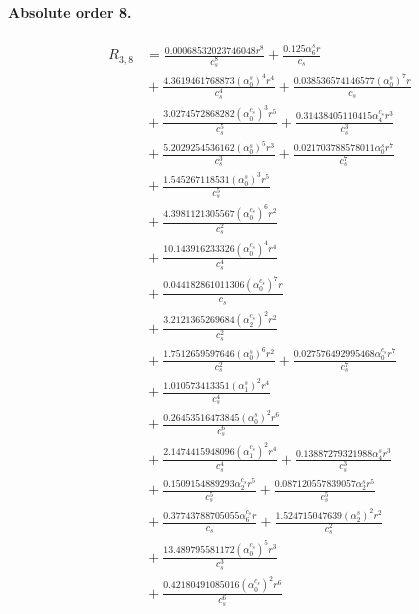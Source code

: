 \documentclass[10pt]{article}
\begin{document}
\paragraph{Absolute order 8.}
\begin{align*}
R_{3,8} &= \frac{0.00068532023746048 r^{8}}{c_{s}^{8}} + \frac{0.125 \alpha_{6}^s r}{c_{s}} \\
&{}  + \frac{4.3619461768873 \left(\alpha_{0}^s\right)^{4} r^{4}}{c_{s}^{4}} + \frac{0.038536574146577 \left(\alpha_{0}^s\right)^{7} r}{c_{s}} \\
&{}  + \frac{3.0274572868282 \left(\alpha_{0}^{c_s}\right)^{3} r^{5}}{c_{s}^{5}} + \frac{0.31438405110415 \alpha_{4}^{c_s} r^{3}}{c_{s}^{3}} \\
&{}  + \frac{5.2029254536162 \left(\alpha_{0}^s\right)^{5} r^{3}}{c_{s}^{3}} + \frac{0.021703788578011 \alpha_{0}^s r^{7}}{c_{s}^{7}} \\
&{}  + \frac{1.545267118531 \left(\alpha_{0}^s\right)^{3} r^{5}}{c_{s}^{5}} \\
&{}  + \frac{4.3981121305567 \left(\alpha_{0}^{c_s}\right)^{6} r^{2}}{c_{s}^{2}} \\
&{}  + \frac{10.143916233326 \left(\alpha_{0}^{c_s}\right)^{4} r^{4}}{c_{s}^{4}} \\
&{}  + \frac{0.044182861011306 \left(\alpha_{0}^{c_s}\right)^{7} r}{c_{s}} \\
&{}  + \frac{3.2121365269684 \left(\alpha_{2}^{c_s}\right)^{2} r^{2}}{c_{s}^{2}} \\
&{}  + \frac{1.7512659597646 \left(\alpha_{0}^s\right)^{6} r^{2}}{c_{s}^{2}} + \frac{0.027576492995468 \alpha_{0}^{c_s} r^{7}}{c_{s}^{7}} \\
&{}  + \frac{1.010573413351 \left(\alpha_{1}^s\right)^{2} r^{4}}{c_{s}^{4}} \\
&{}  + \frac{0.26453516473845 \left(\alpha_{0}^s\right)^{2} r^{6}}{c_{s}^{6}} \\
&{}  + \frac{2.1474415948096 \left(\alpha_{1}^{c_s}\right)^{2} r^{4}}{c_{s}^{4}} + \frac{0.13887279321988 \alpha_{4}^s r^{3}}{c_{s}^{3}} \\
&{}  + \frac{0.1509154889293 \alpha_{2}^{c_s} r^{5}}{c_{s}^{5}} + \frac{0.087120557839057 \alpha_{2}^s r^{5}}{c_{s}^{5}} \\
&{}  + \frac{0.37743788705055 \alpha_{6}^{c_s} r}{c_{s}} + \frac{1.524715047639 \left(\alpha_{2}^s\right)^{2} r^{2}}{c_{s}^{2}} \\
&{}  + \frac{13.489795581172 \left(\alpha_{0}^{c_s}\right)^{5} r^{3}}{c_{s}^{3}} \\
&{}  + \frac{0.42180491085016 \left(\alpha_{0}^{c_s}\right)^{2} r^{6}}{c_{s}^{6}} \\

\end{align*}
\end{document}
